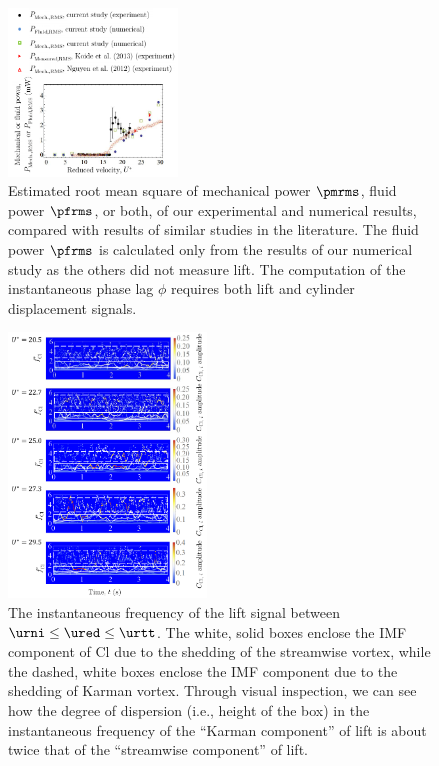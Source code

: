\documentclass[a4paper,fleqn]{cas-sc}
\begin{document}
\begin{figure}
  \centering
  \includegraphics[width=0.4\textwidth]{figs/figure20}
  \caption{Estimated root mean square of mechanical power $\pmrms$, fluid power $\pfrms$, or both, of our experimental and numerical results, compared with results of similar studies in the literature. The fluid power $\pfrms$ is calculated only from the results of our numerical study as the others did not measure lift. The computation of the instantaneous phase lag $\phi$ requires both lift and cylinder displacement signals.}
  \label{fig:powerComparison}
\end{figure}


\begin{figure}
  \centering
  \includegraphics[width=0.47\textwidth]{figs/figure21}
  \caption{The instantaneous frequency of the lift signal between $\urni \leq \ured \leq \urtt$. The white, solid boxes enclose the IMF component of Cl due to the shedding of the streamwise vortex, while the dashed, white boxes enclose the IMF component due to the shedding of Karman vortex. Through visual inspection, we can see how the degree of dispersion (i.e., height of the box) in the instantaneous frequency of the ``Karman component'' of lift is about twice that of the ``streamwise component'' of lift.}
  \label{fig:instantLiftFreq}
\end{figure}
\end{document}
